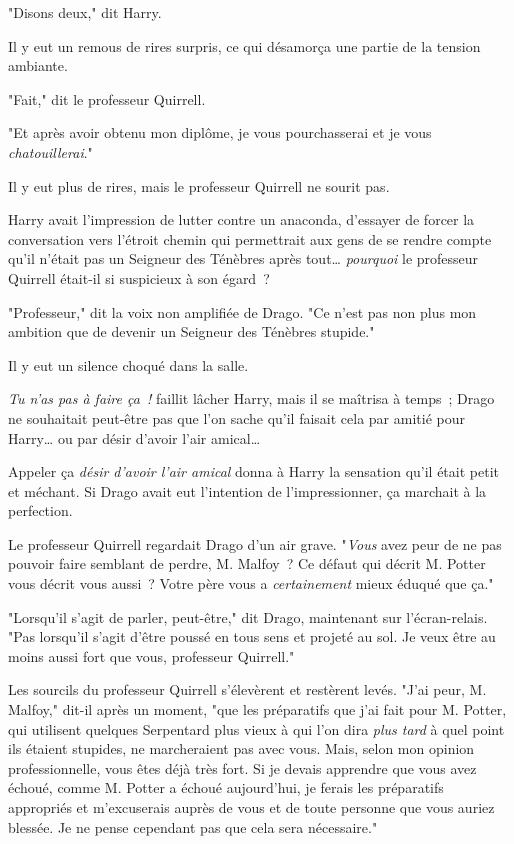 "Disons deux," dit Harry.

Il y eut un remous de rires surpris, ce qui désamorça une partie de la tension ambiante.

"Fait," dit le professeur Quirrell.

"Et après avoir obtenu mon diplôme, je vous pourchasserai et je vous \emph{chatouillerai}."

Il y eut plus de rires, mais le professeur Quirrell ne sourit pas.

Harry avait l'impression de lutter contre un anaconda, d'essayer de forcer la conversation vers l'étroit chemin qui permettrait aux gens de se rendre compte qu'il n'était pas un Seigneur des Ténèbres après tout… \emph{pourquoi} le professeur Quirrell était-il si suspicieux à son égard~?

"Professeur," dit la voix non amplifiée de Drago. "Ce n'est pas non plus mon ambition que de devenir un Seigneur des Ténèbres stupide."

Il y eut un silence choqué dans la salle.

\emph{Tu n'as pas à faire ça~!} faillit lâcher Harry, mais il se maîtrisa à temps~; Drago ne souhaitait peut-être pas que l'on sache qu'il faisait cela par amitié pour Harry… ou par désir d'avoir l'air amical…

Appeler ça \emph{désir d'avoir l'air amical} donna à Harry la sensation qu'il était petit et méchant. Si Drago avait eut l'intention de l'impressionner, ça marchait à la perfection.

Le professeur Quirrell regardait Drago d'un air grave. "\emph{Vous} avez peur de ne pas pouvoir faire semblant de perdre, M. Malfoy~? Ce défaut qui décrit M. Potter vous décrit vous aussi~? Votre père vous a \emph{certainement} mieux éduqué que ça."

"Lorsqu'il s'agit de parler, peut-être," dit Drago, maintenant sur l'écran-relais. "Pas lorsqu'il s'agit d'être poussé en tous sens et projeté au sol. Je veux être au moins aussi fort que vous, professeur Quirrell."

Les sourcils du professeur Quirrell s'élevèrent et restèrent levés. "J'ai peur, M. Malfoy," dit-il après un moment, "que les préparatifs que j'ai fait pour M. Potter, qui utilisent quelques Serpentard plus vieux à qui l'on dira \emph{plus tard} à quel point ils étaient stupides, ne marcheraient pas avec vous. Mais, selon mon opinion professionnelle, vous êtes déjà très fort. Si je devais apprendre que vous avez échoué, comme M. Potter a échoué aujourd'hui, je ferais les préparatifs appropriés et m'excuserais auprès de vous et de toute personne que vous auriez blessée. Je ne pense cependant pas que cela sera nécessaire."

